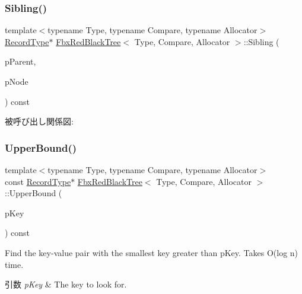 \subsubsection{\texorpdfstring{Sibling()}{Sibling()}}
{\footnotesize\ttfamily template$<$typename Type, typename Compare, typename Allocator$>$ \\
\hyperlink{class_fbx_red_black_tree_1_1_record_type}{Record\+Type}$\ast$ \hyperlink{class_fbx_red_black_tree}{Fbx\+Red\+Black\+Tree}$<$ Type, Compare, Allocator $>$\+::Sibling (\begin{DoxyParamCaption}\item[{const \hyperlink{class_fbx_red_black_tree_1_1_record_type}{Record\+Type} $\ast$}]{p\+Parent,  }\item[{const \hyperlink{class_fbx_red_black_tree_1_1_record_type}{Record\+Type} $\ast$}]{p\+Node }\end{DoxyParamCaption}) const\hspace{0.3cm}{\ttfamily [protected]}}

被呼び出し関係図\+:
\mbox{\label{class_fbx_red_black_tree_a42a816012df609184b4cef2889ac868a}} 
\subsubsection{\texorpdfstring{Upper\+Bound()}{UpperBound()}\hspace{0.1cm}{\footnotesize\ttfamily [1/2]}}
{\footnotesize\ttfamily template$<$typename Type, typename Compare, typename Allocator$>$ \\
const \hyperlink{class_fbx_red_black_tree_1_1_record_type}{Record\+Type}$\ast$ \hyperlink{class_fbx_red_black_tree}{Fbx\+Red\+Black\+Tree}$<$ Type, Compare, Allocator $>$\+::Upper\+Bound (\begin{DoxyParamCaption}\item[{const \hyperlink{class_fbx_red_black_tree_a241b31c6972995417d193458b7bb27e2}{Key\+Type} \&}]{p\+Key }\end{DoxyParamCaption}) const}

Find the key-\/value pair with the smallest key greater than p\+Key. Takes O(log n) time. 
\begin{DoxyParams}{引数}
{\em p\+Key} & The key to look for. \\
\hline
\end{DoxyParams}
\mbox{\label{class_fbx_red_black_tree_a90138895586387a60eb91306888a2ab6}} 
